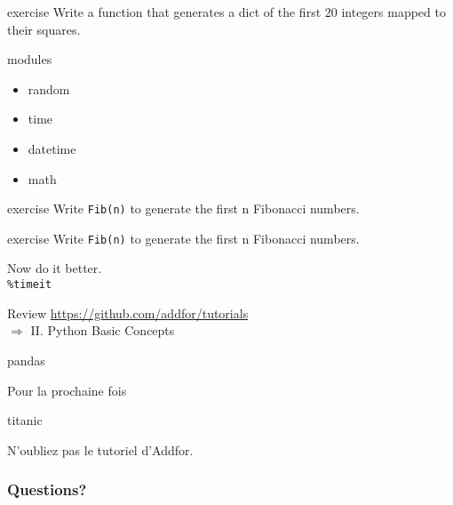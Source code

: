 \begin{frame}{exercise}
  Write a function that generates a dict of the first 20 integers
  mapped to their squares.
\end{frame}

\begin{frame}{modules}
  \begin{itemize}
  \item random
  \item time
  \item datetime
  \item math
  \end{itemize}
\end{frame}

\begin{frame}{exercise}
  Write \texttt{Fib(n)} to generate the first n Fibonacci numbers.
\end{frame}

\begin{frame}{exercise}
  Write \texttt{Fib(n)} to generate the first n Fibonacci numbers.

  Now do it better.\\
  \texttt{\%timeit}
\end{frame}

\begin{frame}{Review}
  \vspace{1cm}
  \url{https://github.com/addfor/tutorials}\\[2mm]

  \vspace{1mm}
  \hspace{5mm} $\Rightarrow$ II. Python Basic Concepts
\end{frame}

\begin{frame}{pandas}
\end{frame}

\begin{frame}{Pour la prochaine fois}

  \vspace{1cm}
  \centerline{titanic}

  \bigskip
  \centerline{N'oubliez pas le tutoriel d'Addfor.}
\end{frame}


\begin{frame}
  \frametitle{Questions?}
\end{frame}


